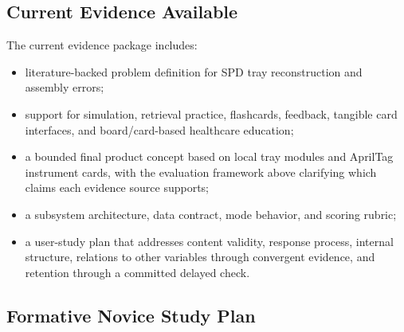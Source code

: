 \documentclass[10pt,a4paper]{article}
\begin{document}
\subsection{Current Evidence Available}

The current evidence package includes:
\begin{itemize}
  \item literature-backed problem definition for SPD tray reconstruction and assembly errors;
  \item support for simulation, retrieval practice, flashcards, feedback, tangible card interfaces, and board/card-based healthcare education;
  \item a bounded final product concept based on local tray modules and AprilTag instrument cards, with the evaluation framework above clarifying which claims each evidence source supports;
  \item a subsystem architecture, data contract, mode behavior, and scoring rubric;
  \item a user-study plan that addresses content validity, response process, internal structure, relations to other variables through convergent evidence, and retention through a committed delayed check.
\end{itemize}
\subsection{Formative Novice Study Plan}
\end{document}
